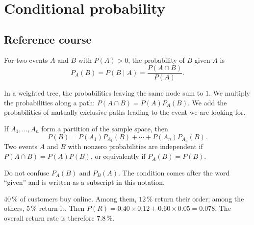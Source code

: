 
\chapter{Conditional probability}
\section{Reference course}
For two events $A$ and $B$ with $P(A)>0$, the probability of $B$ given $A$ is
\[
P_A(B)=P(B\mid A)=\frac{P(A\cap B)}{P(A)}.
\]

\begin{center}
\end{center}

\begin{retenir}
In a weighted tree, the probabilities leaving the same node sum to $1$. We multiply the probabilities along a path: $P(A\cap B)=P(A)P_A(B)$. We add the probabilities of mutually exclusive paths leading to the event we are looking for.
\end{retenir}

If $A_1,\ldots,A_n$ form a partition of the sample space, then
\[
P(B)=P(A_1)P_{A_1}(B)+\cdots+P(A_n)P_{A_n}(B).
\]
Two events $A$ and $B$ with nonzero probabilities are independent if $P(A\cap B)=P(A)P(B)$, or equivalently if $P_A(B)=P(B)$.

\begin{erreur}
Do not confuse $P_A(B)$ and $P_B(A)$. The condition comes after the word ``given'' and is written as a subscript in this notation.
\end{erreur}

\begin{exemple}
$40\,\%$ of customers buy online. Among them, $12\,\%$ return their order; among the others, $5\,\%$ return it. Then $P(R)=0.40\times0.12+0.60\times0.05=0.078$. The overall return rate is therefore $7.8\,\%$.
\end{exemple}

